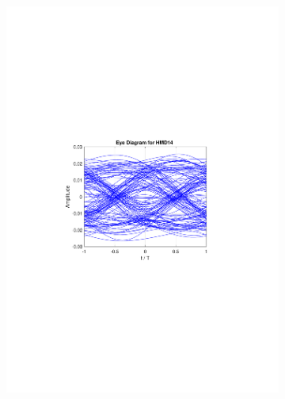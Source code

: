 \begin{figure}
	\centering
	\begin{subfigure}{.5\textwidth}
		\centering
		\includegraphics[clip, trim=5cm 10cm 5cm 10cm, width=\textwidth]{./sdf/m_qam_system/figures/HMD14_eye_diagram_60.pdf}
	\end{subfigure}%
	\begin{subfigure}{.5\textwidth}
		\centering

\end{subfigure}
\end{figure}

